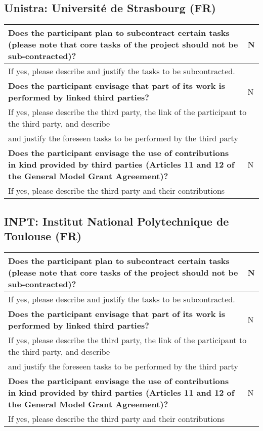 \subsection{Unistra: Université de Strasbourg (FR)}

\begin{longtable}{|p{}|p{}|}
\hline
{\bf Does the participant plan to subcontract certain tasks (please
  note that core tasks of the project should not be sub-contracted)?}
&
N
\\
\hline
\multicolumn{2}{|l|}{
If yes, please describe and justify the tasks to be subcontracted.}
\\
\hline
{\bf Does the participant envisage that  part of its work is performed
  by linked third parties?}
&
N
\\
\hline
\multicolumn{2}{|l|}{If yes, please describe the third party, the link of the
  participant to the third party, and describe}\\
\multicolumn{2}{|l|}{and justify the foreseen
tasks to be performed by the third party}
\\
\hline
{\bf Does the participant envisage the use of contributions in kind
provided by third parties (Articles 11 and 12 of the General Model
Grant Agreement)?}
&
N
\\
\hline
\multicolumn{2}{|l|}{If yes, please describe the third party and their contributions}
\\
\hline
\end{longtable}


\subsection{INPT: Institut National Polytechnique de Toulouse (FR)}

\begin{longtable}{|p{}|p{}|}
\hline
{\bf Does the participant plan to subcontract certain tasks (please
  note that core tasks of the project should not be sub-contracted)?}
&
N
\\
\hline
\multicolumn{2}{|l|}{
If yes, please describe and justify the tasks to be subcontracted.}
\\
\hline
{\bf Does the participant envisage that  part of its work is performed
  by linked third parties?}
&
N
\\
\hline
\multicolumn{2}{|l|}{If yes, please describe the third party, the link of the
  participant to the third party, and describe}\\
\multicolumn{2}{|l|}{and justify the foreseen
tasks to be performed by the third party}
\\
\hline
{\bf Does the participant envisage the use of contributions in kind
provided by third parties (Articles 11 and 12 of the General Model
Grant Agreement)?}
&
N
\\
\hline
\multicolumn{2}{|l|}{If yes, please describe the third party and their contributions}
\\
\hline
\end{longtable}

